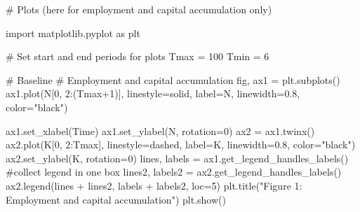 \documentclass[
  letterpaper,
  DIV=11,
  numbers=noendperiod]{scrreprt}
\newenvironment{Shaded}{\begin{snugshade}}{\end{snugshade}}
\newcommand{\CommentTok}[1]{\textcolor[rgb]{0.37,0.37,0.37}{#1}}
\newcommand{\DecValTok}[1]{\textcolor[rgb]{0.68,0.00,0.00}{#1}}
\newcommand{\FloatTok}[1]{\textcolor[rgb]{0.68,0.00,0.00}{#1}}
\newcommand{\ImportTok}[1]{\textcolor[rgb]{0.00,0.46,0.62}{#1}}
\newcommand{\NormalTok}[1]{\textcolor[rgb]{0.00,0.23,0.31}{#1}}
\newcommand{\OperatorTok}[1]{\textcolor[rgb]{0.37,0.37,0.37}{#1}}
\newcommand{\StringTok}[1]{\textcolor[rgb]{0.13,0.47,0.30}{#1}}
\begin{document}
\begin{tcolorbox}[enhanced jigsaw, titlerule=0mm, breakable, bottomrule=.15mm, toprule=.15mm, colbacktitle=quarto-callout-note-color!10!white, rightrule=.15mm, toptitle=1mm, opacityback=0, left=2mm, coltitle=black, title=\textcolor{quarto-callout-note-color}{\faInfo}\hspace{0.5em}{Python code}, colframe=quarto-callout-note-color-frame, opacitybacktitle=0.6, leftrule=.75mm, bottomtitle=1mm, arc=.35mm, colback=white]

\begin{Shaded}
\begin{Highlighting}[]
\CommentTok{\# Plots (here for employment and capital accumulation only)}

\ImportTok{import}\NormalTok{ matplotlib.pyplot }\ImportTok{as}\NormalTok{ plt}

\CommentTok{\# Set start and end periods for plots}
\NormalTok{Tmax }\OperatorTok{=} \DecValTok{100}
\NormalTok{Tmin }\OperatorTok{=} \DecValTok{6}

\CommentTok{\# Baseline}
\CommentTok{\# Employment and capital accumulation}
\NormalTok{fig, ax1 }\OperatorTok{=}\NormalTok{ plt.subplots()}
\NormalTok{ax1.plot(N[}\DecValTok{0}\NormalTok{, }\DecValTok{2}\NormalTok{:(Tmax}\OperatorTok{+}\DecValTok{1}\NormalTok{)], linestyle}\OperatorTok{=}\StringTok{\textquotesingle{}solid\textquotesingle{}}\NormalTok{, label}\OperatorTok{=}\StringTok{\textquotesingle{}N\textquotesingle{}}\NormalTok{, linewidth}\OperatorTok{=}\FloatTok{0.8}\NormalTok{, color}\OperatorTok{=}\StringTok{"black"}\NormalTok{)}

\NormalTok{ax1.set\_xlabel(}\StringTok{\textquotesingle{}Time\textquotesingle{}}\NormalTok{)}
\NormalTok{ax1.set\_ylabel(}\StringTok{\textquotesingle{}N\textquotesingle{}}\NormalTok{, rotation}\OperatorTok{=}\DecValTok{0}\NormalTok{)}
\NormalTok{ax2 }\OperatorTok{=}\NormalTok{ ax1.twinx()}
\NormalTok{ax2.plot(K[}\DecValTok{0}\NormalTok{, }\DecValTok{2}\NormalTok{:Tmax], linestyle}\OperatorTok{=}\StringTok{\textquotesingle{}dashed\textquotesingle{}}\NormalTok{, label}\OperatorTok{=}\StringTok{\textquotesingle{}K\textquotesingle{}}\NormalTok{, linewidth}\OperatorTok{=}\FloatTok{0.8}\NormalTok{, color}\OperatorTok{=}\StringTok{"black"}\NormalTok{)}
\NormalTok{ax2.set\_ylabel(}\StringTok{\textquotesingle{}K\textquotesingle{}}\NormalTok{, rotation}\OperatorTok{=}\DecValTok{0}\NormalTok{)}
\NormalTok{lines, labels }\OperatorTok{=}\NormalTok{ ax1.get\_legend\_handles\_labels() }\CommentTok{\#collect legend in one box}
\NormalTok{lines2, labels2 }\OperatorTok{=}\NormalTok{ ax2.get\_legend\_handles\_labels()}
\NormalTok{ax2.legend(lines }\OperatorTok{+}\NormalTok{ lines2, labels }\OperatorTok{+}\NormalTok{ labels2, loc}\OperatorTok{=}\DecValTok{5}\NormalTok{)}
\NormalTok{plt.title(}\StringTok{"Figure 1: Employment and capital accumulation"}\NormalTok{)}
\NormalTok{plt.show()}
\end{Highlighting}
\end{Shaded}

\end{tcolorbox}
\end{document}

